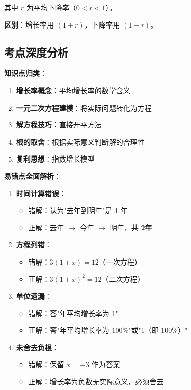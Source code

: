\documentclass[UTF8]{ctexart}
\newenvironment{redenv}{\color{red}}{}
\newenvironment{conceptbox}{%
    \begin{tcolorbox}[colback=red!5, colframe=red!50!black, title=概念解析, fonttitle=\bfseries]
}{%
    \end{tcolorbox}
}
\newenvironment{formuladerivation}{%
    \begin{enumerate}[label={\textbf{公式\arabic*：}}, leftmargin=*, align=left]
}{%
    \end{enumerate}
}
\begin{document}
\begin{redenv}
\begin{formuladerivation}
其中 $r$ 为平均下降率（$0 < r < 1$）。

\textbf{区别}：增长率用 $(1+r)$，下降率用 $(1-r)$。
\end{formuladerivation}

\subsection*{考点深度分析}

\begin{conceptbox}
\textbf{知识点归类}：
\begin{enumerate}
    \item \textbf{增长率概念}：平均增长率的数学含义
    \item \textbf{一元二次方程建模}：将实际问题转化为方程
    \item \textbf{解方程技巧}：直接开平方法
    \item \textbf{根的取舍}：根据实际意义判断解的合理性
    \item \textbf{复利思想}：指数增长模型
\end{enumerate}
\end{conceptbox}

\noindent\textbf{易错点全面解析}：
\begin{enumerate}[label=\arabic*.]
    \item \textbf{时间计算错误}：
    \begin{itemize}
        \item 错解：认为"去年到明年"是 1 年
        \item 正解：去年 $\to$ 今年 $\to$ 明年，共 \textbf{2年}
    \end{itemize}
    
    \item \textbf{方程列错}：
    \begin{itemize}
        \item 错解：$3(1+x) = 12$（一次方程）
        \item 正解：$3(1+x)^2 = 12$（二次方程）
    \end{itemize}
    
    \item \textbf{单位遗漏}：
    \begin{itemize}
        \item 错解：答"年平均增长率为 1"
        \item 正解：答"年平均增长率为 $100\%$"或"1（即 $100\%$）"
    \end{itemize}
    
    \item \textbf{未舍去负根}：
    \begin{itemize}
        \item 错解：保留 $x = -3$ 作为答案
        \item 正解：增长率为负数无实际意义，必须舍去
    \end{itemize}
    

\end{enumerate}
\end{redenv}
\end{document}
